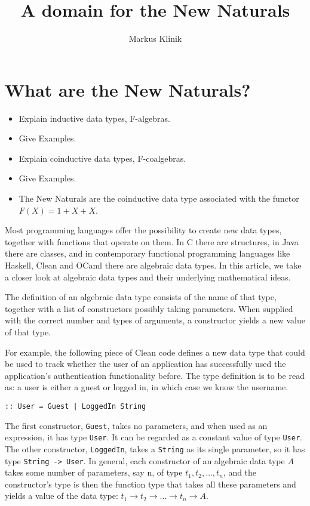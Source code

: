 \documentclass[a4paper]{article}
\newcommand{\arr}{\rightarrow}
\begin{document}
\title{A domain for the New Naturals}
\author{Markus Klinik}
\maketitle


\section{What are the New Naturals?}


\begin{itemize}
\item Explain inductive data types, F-algebras.
\item Give Examples.
\item Explain coinductive data types, F-coalgebras.
\item Give Examples.
\item The New Naturals are the coinductive data type associated with the
functor $F(X) = 1 + X + X$.
\end{itemize}


Most programming languages offer the possibility to create new data types,
together with functions that operate on them.  In C there are structures, in
Java there are classes, and in contemporary functional programming languages
like Haskell, Clean and OCaml there are algebraic data types.  In this article,
we take a closer look at algebraic data types and their underlying mathematical
ideas.

The definition of an algebraic data type consists of the name of that type,
together with a list of constructors possibly taking parameters.  When supplied
with the correct number and types of arguments, a constructor yields a new
value of that type.

For example, the following piece of Clean code defines a new data type that
could be used to track whether the user of an application has successfully used
the application's authentication functionality before.  The type definition is
to be read as: a user is either a guest or logged in, in which case we know the
username.

\begin{verbatim}
:: User = Guest | LoggedIn String
\end{verbatim}

The first constructor, \verb+Guest+, takes no parameters, and when used as an
expression, it has type \verb+User+.  It can be regarded as a constant value of
type \verb+User+.  The other constructor, \verb+LoggedIn+, takes a
\verb+String+ as its single parameter, so it has type \verb+String -> User+.
In general, each constructor of an algebraic data type $A$ takes some number of
parameters, say n, of type $t_1, t_2, \ldots, t_n$, and the constructor's type
is then the function type that takes all these parameters and yields a value of
the data type: $t_1 \arr t_2 \arr \ldots \arr t_n \arr A$.
\end{document}
